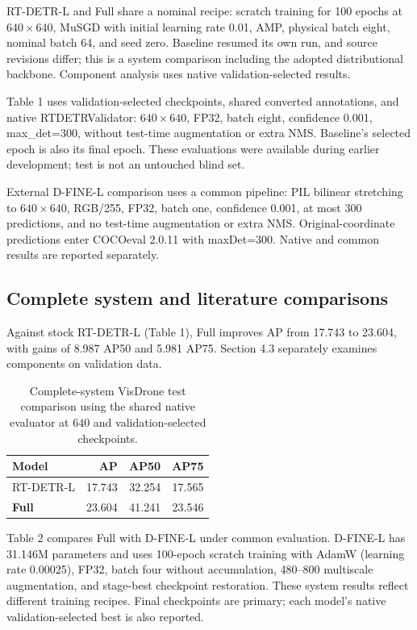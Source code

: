 RT-DETR-L and Full share a nominal recipe: scratch training for 100 epochs at $640\times640$, MuSGD with initial learning rate 0.01, AMP, physical batch eight, nominal batch 64, and seed zero. Baseline resumed its own run, and source revisions differ; this is a system comparison including the adopted distributional backbone. Component analysis uses native validation-selected results.


Table 1 uses validation-selected checkpoints, shared converted annotations, and native RTDETRValidator: $640\times640$, FP32, batch eight, confidence 0.001, max\_det=300, without test-time augmentation or extra NMS. Baseline's selected epoch is also its final epoch. These evaluations were available during earlier development; test is not an untouched blind set.


External D-FINE-L comparison uses a common pipeline: PIL bilinear stretching to $640\times640$, RGB/255, FP32, batch one, confidence 0.001, at most 300 predictions, and no test-time augmentation or extra NMS. Original-coordinate predictions enter COCOeval 2.0.11 with maxDet=300. Native and common results are reported separately.


\subsection{Complete system and literature comparisons}

Against stock RT-DETR-L (Table 1), Full improves AP from 17.743 to 23.604, with gains of 8.987 AP50 and 5.981 AP75. Section 4.3 separately examines components on validation data.


\begin{table}[t]
\caption{Complete-system VisDrone test comparison using the shared native evaluator at 640 and validation-selected checkpoints.}
\label{tab:1}
\centering\tablefont
\begin{tabular*}{\columnwidth}{@{\extracolsep{\fill}}lrrr@{}}
\toprule
\textbf{Model} & \textbf{AP} & \textbf{AP50} & \textbf{AP75} \\
\midrule
RT-DETR-L & 17.743 & 32.254 & 17.565 \\
\textbf{Full} & 23.604 & 41.241 & 23.546 \\
\bottomrule
\end{tabular*}
\end{table}

Table 2 compares Full with D-FINE-L under common evaluation. D-FINE-L has 31.146M parameters and uses 100-epoch scratch training with AdamW (learning rate 0.00025), FP32, batch four without accumulation, 480--800 multiscale augmentation, and stage-best checkpoint restoration. These system results reflect different training recipes. Final checkpoints are primary; each model's native validation-selected best is also reported.


